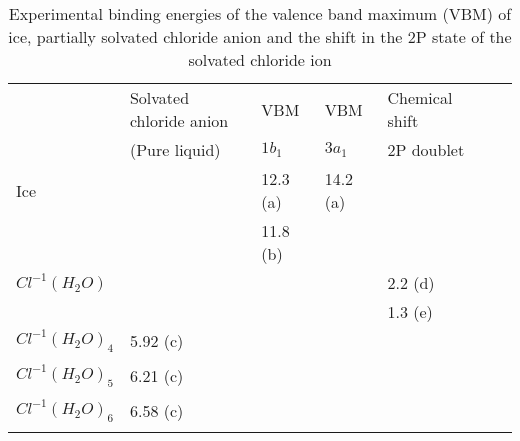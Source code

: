 \documentclass[a4paper,11pt]{report}
\begin{document}
\begin{table}[H]\small
\begin{center}
\caption{Experimental binding energies of the valence band maximum (VBM) of ice, partially solvated chloride anion and the shift in the 2P state of the solvated chloride ion} \label{tab:1}
\begin{tabular}{|l|l|l|l|l|l|l|}
\hline
&Solvated chloride anion &\hspace*{0.4cm}VBM&\hspace*{0.4cm}VBM&\hspace*{0.2cm}Chemical shift\\
&\hspace*{0.6cm}(Pure liquid)&\hspace*{0.5cm}$1b_{1}$&\hspace*{0.5cm}$3a_{1}$&\hspace*{0.5cm}2P doublet\\ 
\hline
Ice&\hspace*{0.4cm}&\hspace*{0.4cm}12.3 (a)&\hspace*{0.4cm}14.2 (a)&\hspace*{0.4cm}\\
&&\hspace*{0.4cm}11.8 (b)&&\\
\hline
$Cl^{-1}(H_{2}O)$&\hspace*{0.4cm}&\hspace*{0.4cm}&\hspace*{0.4cm}&\hspace*{0.4cm}2.2 (d)\\
&&\hspace*{0.4cm}&&\hspace*{0.4cm}1.3 (e)\\
\hline
$Cl^{-1}(H_{2}O)_{4}$&\hspace*{0.7cm}5.92 (c)&\hspace*{0.4cm}&\hspace*{0.4cm}&\\
&&\hspace*{0.4cm}&&\\
\hline
$Cl^{-1}(H_{2}O)_{5}$&\hspace*{0.7cm}6.21 (c)&\hspace*{0.4cm}&\hspace*{0.4cm}&\\
&&\hspace*{0.4cm}&&\\
\hline
$Cl^{-1}(H_{2}O)_{6}$&\hspace*{0.7cm}6.58 (c)&\hspace*{0.4cm}&\hspace*{0.4cm}&\\
&&\hspace*{0.4cm}&&\\
\hline
\end{tabular}
\label{table1n}
\end{center}
\end{table}
\end{document}
